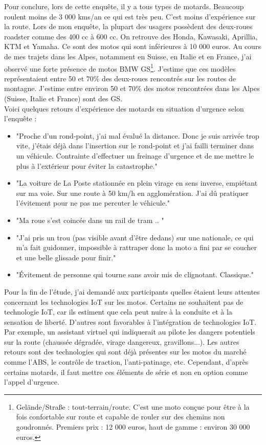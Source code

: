 Pour conclure, lors de cette enquête, il y a tous types de motards. Beaucoup roulent moins de 3 000 kms/an ce qui est très peu. C'est moins d'expérience sur la route.
Lors de mon enquête, la plupart des usagers possèdent des deux-roues roadster comme des 400 cc à 600 cc. On retrouve des Honda, Kawasaki, Aprillia, KTM et Yamaha. Ce sont des motos qui sont inférieures à 10 000 euros.
Au cours de mes trajets dans les Alpes, notamment en Suisse, en Italie et en France, j’ai observé une forte présence de motos BMW GS\footnote{Gelände/Straße : tout-terrain/route. C'est une moto conçue pour être à la fois confortable sur route et capable de rouler sur des chemins non goudronnés. Premiers prix : 12 000 euros, haut de gamme : environ 30 000 euros.}. J’estime que ces modèles représentaient entre 50 et 70\% des deux-roues rencontrés sur les routes de montagne. J'estime entre environ 50 et 70\% des motos rencontrées dans les Alpes (Suisse, Italie et France) sont des GS.\\
Voici quelques retours d'expérience des motards en situation d'urgence selon l'enquête :\\
\begin{itemize}
  \item "Proche d'un rond-point, j'ai mal évalué la distance. Donc je suis arrivée trop vite, j'étais déjà dans l'insertion sur le rond-point et j'ai failli terminer dans un véhicule. Contrainte d'effectuer un freinage d'urgence et de me mettre le plus à l'extérieur pour éviter la catastrophe."
  \item "La voiture de La Poste stationnée en plein virage en sens inverse, empiétant sur ma voie. Sur une route à 50 km/h en agglomération. J'ai dû pratiquer l'évitement pour ne pas me percuter le véhicule."
  \item "Ma roue s’est coincée dans un rail de tram .. "
  \item "J'ai pris un trou (pas visible avant d'être dedans) sur une nationale, ce qui m'a fait guidonner, impossible à rattraper donc la moto a fini par se coucher et une belle glissade pour finir."
  \item "Évitement de personne qui tourne sans avoir mis de clignotant. Classique."
\end{itemize}
\vspace{0.5cm}

Pour la fin de l'étude, j'ai demandé aux participants quelles étaient leurs attentes concernant les technologies IoT sur les motos. Certains ne souhaitent pas de technologie IoT, car ils estiment que cela peut nuire à la conduite et à la sensation de liberté. D'autres sont favorables à l'intégration de technologies IoT. Par exemple, un assistant virtuel qui indiquerait au pilote les dangers potentiels sur la route (chaussée dégradée, virage dangereux, gravillons...). Les autres retours sont des technologies qui sont déjà présentes sur les motos du marché comme l'ABS, le contrôle de traction, l'anti-patinage, etc. Cependant, d'après certains motards, il faut mettre ces éléments de série et non en option comme l'appel d'urgence.
\vspace{0.5cm}

